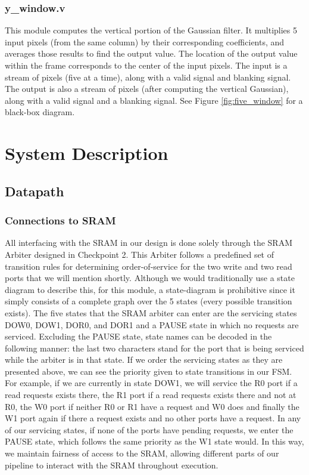 \subsubsection{y\_window.v}

This module computes the vertical portion of the Gaussian filter. It multiplies 
5 input pixels (from the same column) by their corresponding coefficients, and 
averages those results to find the output value. The location of the output 
value within the frame corresponds to the center of the input pixels. The input 
is a stream of pixels (five at a time), along with a valid signal and blanking 
signal. The output is also a stream of pixels (after computing the vertical 
Gaussian), along with a valid signal and a blanking signal. See Figure \ref{fig:five_window} for a 
black-box diagram.


\section{System Description}

\subsection{Datapath}

\subsubsection{Connections to SRAM}

All interfacing with the SRAM in our design is done solely through the SRAM 
Arbiter designed in Checkpoint 2. This Arbiter follows a predefined set of 
transition rules for determining order-of-service for the two write and two read
ports that we will mention shortly. Although we would traditionally use a state diagram to describe this, for 
this module, a state-diagram is prohibitive since it simply consists
of a complete graph over the 5 states (every possible transition exists). The 
five states that the SRAM arbiter can enter are the servicing states 
DOW0, DOW1, DOR0, and DOR1 and a PAUSE state in which no requests are serviced. 
Excluding the PAUSE state,
state names can be decoded in the following manner: the last two characters
stand for the port that is being serviced while the arbiter is in that state.
If we order the servicing states as they are presented above, we can see the priority given
to state transitions in our FSM. For example, if we are currently in state DOW1,
we will service the R0 port if a read requests exists there, the R1 port if a 
read requests exists there and not at R0, the W0 port if neither R0 or R1 have 
a request and W0 does and finally the W1 port again if there a request exists
and no other ports have a request. In any of our servicing states, if none of 
the ports have pending requests, we enter the PAUSE state, which follows the
same priority as the W1 state would. In this way, we maintain fairness of 
access to the SRAM, allowing different parts of our pipeline to interact
with the SRAM throughout execution.

